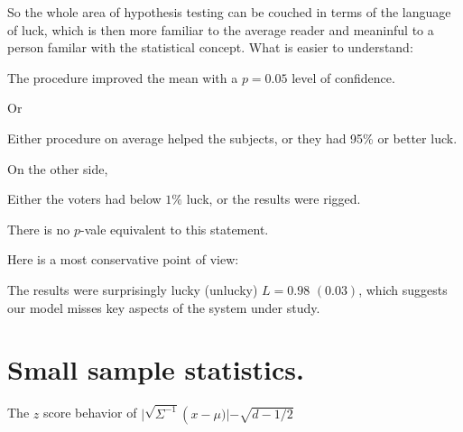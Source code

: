 So the whole area of hypothesis testing can be couched in terms of the language of luck, which is then more familiar to the average reader and meaninful to a person familar with the statistical concept.  What is easier to understand: 
\begin{blockquote}
The procedure improved the mean with a $p=0.05$ level of confidence.
\end{blockquote}
Or
\begin{blockquote}
Either procedure on average helped the subjects, or they had 95\% or better luck.
\end{blockquote}

On the other side,
\begin{blockquote}
Either the voters had below $1\%$ luck, or the results were rigged.
\end{blockquote}
There is no $p$-vale equivalent to this statement.

Here is a most conservative point of view:
\begin{blockquote}
The results were surprisingly lucky (unlucky) $L=0.98$ $(0.03)$, which suggests our model misses key aspects of the system under study.
\end{blockquote}

\section{Small sample statistics.}
The $z$ score behavior of $|\sqrt{\Sigma^{-1}} \left(x-\mu)|-\sqrt{d-1/2}$
